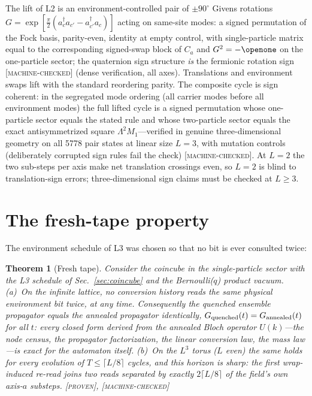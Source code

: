 \documentclass[aps,prd,twocolumn,superscriptaddress,nofootinbib,floatfix]{revtex4-2}
\newtheorem{theorem}{Theorem}
\newcommand{\evP}{\textnormal{\textsc{[proven]}}}
\newcommand{\evM}{\textnormal{\textsc{[machine-checked]}}}
\begin{document}
The lift of L2 is an environment-controlled pair of $\pm90^\circ$ Givens
rotations $G=\exp[\tfrac{\pi}{2}(a^\dagger_c a_{c'}-a^\dagger_{c'}a_c)]$
acting on same-site modes: a signed permutation of the Fock basis,
parity-even, identity at empty control, with single-particle matrix equal
to the corresponding signed-swap block of $C_a$ and $G^2=-\openone$ on the
one-particle sector; the quaternion sign structure \emph{is} the fermionic
rotation sign \evM{} (dense verification, all axes). Translations and
environment swaps lift with the standard reordering parity. The composite
cycle is sign coherent: in the segregated mode ordering (all carrier modes
before all environment modes) the full lifted cycle is a signed permutation
whose one-particle sector equals the stated rule and whose two-particle
sector equals the exact antisymmetrized square $\Lambda^2 M_1$---verified
in genuine three-dimensional geometry on all 5778 pair states at linear
size $L=3$, with mutation controls (deliberately corrupted sign rules fail
the check) \evM{}. At $L=2$ the two
sub-steps per axis make net translation crossings even, so $L=2$ is blind
to translation-sign errors; three-dimensional sign claims must be checked
at $L\ge3$.

\section{The fresh-tape property}
\label{sec:freshtape}

The environment schedule of L3 was chosen so that no bit is ever
consulted twice:

\begin{theorem}[Fresh tape]\label{thm:freshtape}
Consider the coincube in the single-particle sector with the L3 schedule
of Sec.~\ref{sec:coincube} and the Bernoulli($q$) product vacuum.
(a)~On the infinite lattice, no conversion history reads the same
physical environment bit twice, at any time. Consequently the quenched
ensemble propagator equals the annealed propagator \emph{identically},
$G_{\rm quenched}(t)=G_{\rm annealed}(t)$ for all $t$: every closed form
derived from the annealed Bloch operator $U(k)$---the node census, the
propagator factorization, the linear conversion law, the mass law---is
exact for the automaton itself. (b)~On the $L^3$ torus ($L$ even) the
same holds for every evolution of $T\le\lceil L/8\rceil$ cycles, and
this horizon is sharp: the first wrap-induced re-read joins two reads
separated by exactly $2\lceil L/8\rceil$ of the field's own axis-$a$
substeps. \evP{}, \evM{}
\end{theorem}
\end{document}
